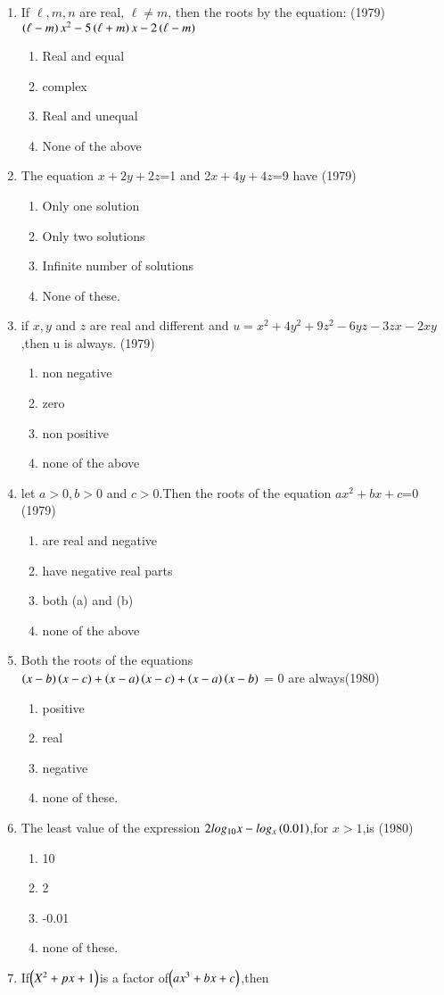 \documentclass[journal,12pt,twocolumn]{IEEEtran}
\theoremstyle{remark}
\begin{document}
\begin{enumerate}
\item If $\ell,m,n$ are real, $\ell\neq m$, then the roots by the  equation: 
\hfill (1979)
 $\left(\ell-m\right)x^2-5\left(\ell+m\right)x-2\left(\ell-m\right)$
\begin{enumerate}
\item Real and equal\item complex\item Real and unequal\item None of the above 
\end{enumerate}
\item  The equation $x+2y+2z$=1 and 2$x+4y+4z$=9 have \hfill (1979)
\begin{enumerate}
\item Only one solution\item Only two solutions\item Infinite number of solutions\item None of these.
\end{enumerate}
\item  if $x,y$ and $z$ are real and different and 
$u=x^2+4y^2+9z^2-6yz-3zx-2xy$,then u is always.
\hfill (1979)
\begin{enumerate}
\item non negative\item zero\item non  positive\item none of the above
\end{enumerate}
\item let $a>0,b>0$ and $c>0$.Then the roots of  the equation 
$ax^2+bx+c$=0 \hfill (1979)
\begin{enumerate} 
\item are real and negative\item have negative real parts\item both (a) and (b)\item none of the above
\end{enumerate}
\item Both the roots of the equations \\
$\left(x-b\right)\left(x-c\right)+\left(x-a\right)\left(x-c\right)+\left(x-a\right)\left(x-b\right)$ = 0 are always\hfill (1980)
\begin{enumerate} 
\item positive\item real\item negative\item none of these.
\end{enumerate}
\item The least value of the expression $2log_{10} x-log_x\left(0.01\right)$,for $x>1$,is \hfill (1980)
\begin{enumerate} 
\item 10\item 2\item -0.01\item none of these.
\end{enumerate}
\item   If$\left(X^2+px+1\right)$is a factor of$\left(ax^3+bx+c\right)$,then


\end{enumerate}
\end{document}
